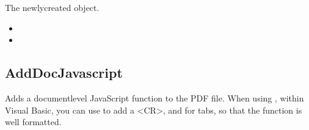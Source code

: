 \documentclass[letterpaper,12pt,english,openany,oneside]{sphinxmanual}
\begin{document}
The newly\sphinxhyphen{}created  object.

\label{\detokenize{IAC_API_FormsIntro:related-methods-7}}
\begin{itemize}
\item {} 

\item {} 

\end{itemize}
\label{\detokenize{IAC_API_FormsIntro:example-22}}

\begin{sphinxVerbatim}[commandchars=\\\{\}]
         
\end{sphinxVerbatim}




\subsection{AddDocJavascript}
\label{\detokenize{IAC_API_FormsIntro:adddocjavascript}}
Adds a document\sphinxhyphen{}level JavaScript function to the PDF file. When using , within Visual Basic, you can use  to add a <CR>, and  for tabs, so that the function is well formatted.

\label{\detokenize{IAC_API_FormsIntro:syntax-34}}

\begin{sphinxVerbatim}[commandchars=\\\{\}]
     
\end{sphinxVerbatim}
\label{\detokenize{IAC_API_FormsIntro:parameters-11}}
\end{document}
